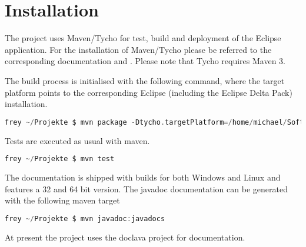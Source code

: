 \section{Installation}
The project uses Maven/Tycho for test, build and deployment of the Eclipse 
application. For the installation of Maven/Tycho please be referred to the 
corresponding documentation \cite{} and \cite{}. Please note that Tycho requires
Maven 3.

The build process is initialised with the following command, where the target 
platform points to the corresponding Eclipse (including the Eclipse Delta Pack) installation.
\begin{lstlisting}[language=C, caption={\emph{bla}},label={lst:shell}]
frey ~/Projekte $ mvn package -Dtycho.targetPlatform=/home/michael/Software/eclipse
\end{lstlisting}
Tests are executed as usual with maven.
\begin{lstlisting}[language=C, caption={\emph{bla}},label={lst:shell}]
frey ~/Projekte $ mvn test
\end{lstlisting}
The documentation is shipped with builds for both Windows and Linux and features
a 32 and 64 bit version. The javadoc documentation can be generated with the 
following maven target
\begin{lstlisting}[language=C, caption={\emph{bla}},label={lst:shell}]
frey ~/Projekte $ mvn javadoc:javadocs
\end{lstlisting}
At present the project uses the doclava project for documentation.


